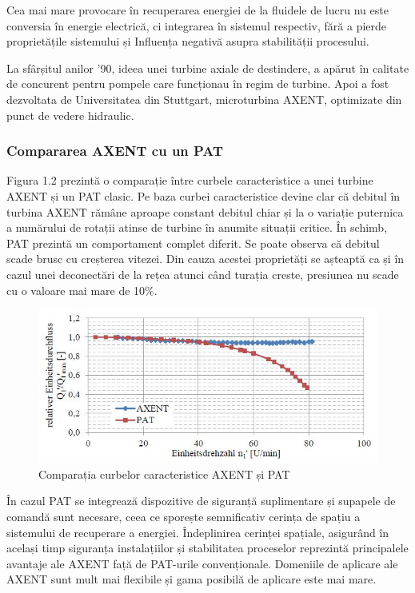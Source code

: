 Cea mai mare provocare în recuperarea energiei de la fluidele de lucru nu este conversia în energie electrică, ci integrarea în sistemul respectiv, fără a pierde proprietățile sistemului și
Influența negativă asupra stabilității procesului.

La sfârșitul anilor '90, ideea unei turbine axiale de destindere, a apărut în calitate de concurent pentru pompele care funcționau în regim de turbine. Apoi a fost dezvoltata de Universitatea din Stuttgart, microturbina AXENT, optimizate din punct de vedere hidraulic.


\subsubsection{Compararea AXENT cu un PAT}

Figura 1.2 prezintă o comparație între curbele caracteristice a unei turbine AXENT și un PAT clasic. Pe baza curbei caracteristice devine clar că debitul în turbina AXENT rămâne aproape constant debitul chiar și la o variație puternica a numărului de rotații atinse de turbine în anumite situații critice. În schimb, PAT prezintă un comportament complet diferit. Se poate observa că debitul scade brusc cu creșterea vitezei. Din cauza acestei proprietăți se așteaptă ca și în cazul unei deconectări de la rețea atunci când turația creste, presiunea nu scade cu o valoare mai mare de 10\%.

\begin{figure}[h!]
	\centering
	\includegraphics[scale=0.7]{figures/axent-pat.jpg}
	\caption{Comparația curbelor caracteristice AXENT și PAT \protect\cite{neipp2017zweistufige}}
	\label{Comparația curbelor caracteristice AXENT și PAT\u{a}}
\end{figure}

În cazul PAT se integrează dispozitive de siguranță suplimentare și supapele de comandă sunt necesare, ceea ce sporește semnificativ cerința de spațiu a sistemului de recuperare a energiei. Îndeplinirea cerinței spațiale, asigurând în același timp siguranța instalațiilor și stabilitatea proceselor reprezintă principalele avantaje ale AXENT față de PAT-urile convenționale. Domeniile de aplicare ale AXENT sunt mult mai flexibile și gama posibilă de aplicare este mai mare.


